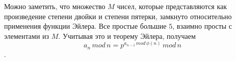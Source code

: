 Можно заметить, что множество $M$ чисел, которые представляются как
произведение степени двойки и степени пятерки,
замкнуто относительно применения функции Эйлера.
Все простые большие $5$, взаимно просты с элементами
из $M$. Учитывая это и теорему Эйлера, получаем
$$a_n \, mod \, n = p ^ {a_{n-1} \, mod \, \phi(n)} \, mod \, n$$.
